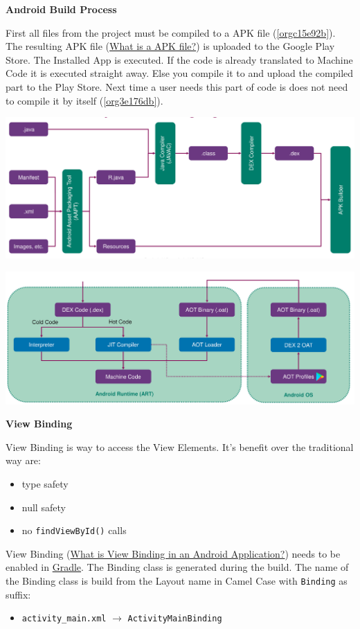 \documentclass[11pt,twoside,landscape]{article}
\begin{document}
\begin{multicols}{3}
\textbf{Android Build Process}

First all files from the project must be compiled to a APK file (\ref{orgc15e92b}).
The resulting APK file (\href{../../../roam/20211109113541-what_is_a_apk_file.org}{What is a APK file?}) is uploaded to the Google Play Store.
The Installed App is executed.
If the code is already translated to Machine Code it is executed straight away.
Else you compile it to and upload the compiled part to the Play Store.
Next time a user needs this part of code is does not need to compile it by itself (\ref{org3e176db}). 

\begin{center}
\includegraphics[width=.9\linewidth]{img/android_build_system_create_apk.png}
\label{orgc15e92b}
\end{center}


\begin{center}
\includegraphics[width=.9\linewidth]{img/android_build_system_art_2_0.png}
\label{org3e176db}
\end{center}

\textbf{View Binding}

View Binding is way to access the View Elements. It's benefit over the traditional way are:
\begin{itemize}
\item type safety
\item null safety
\item no \texttt{findViewById()} calls
\end{itemize}


View Binding (\href{../../../roam/20211112094953-what_is_view_binding_in_an_android_application.org}{What is View Binding in an Android Application?}) needs to be enabled in \href{../../../roam/20211112095502-gradle.org}{Gradle}.
The Binding class is generated during the build.
The name of the Binding class is build from the Layout name in Camel Case with \texttt{Binding} as suffix:
\begin{itemize}
\item \texttt{activity\_main.xml} \(\rightarrow\) \texttt{ActivityMainBinding}
\end{itemize}


\end{multicols}
\end{document}
